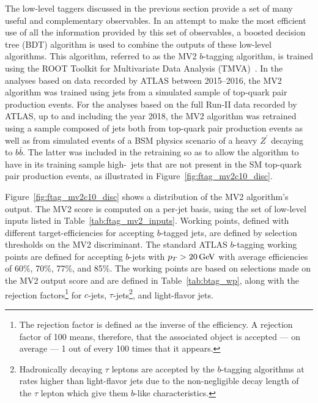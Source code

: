 The low-level taggers discussed in the previous section provide a set of many useful and complementary observables.
In an attempt to make the most efficient use of all the information provided by this set of observables,
a boosted decision tree (BDT) algorithm is used to combine the outputs of these low-level algorithms.
This algorithm, referred to as the MV2 $b$-tagging algorithm, is trained using the ROOT Toolkit for Multivariate
Data Analysis (TMVA)~\cite{TMVA}.
In the analyses based on data recorded by ATLAS between 2015--2016, the MV2 algorithm was trained using jets from
a simulated sample of top-quark pair production events.
For the analyses based on the full Run-II data recorded by ATLAS, up to and including the year 2018, the MV2
algorithm was retrained using a sample composed of jets both from top-quark
pair production events as well as from simulated events of a BSM physics scenario of a heavy $Z^{\prime}$ decaying to $b\bar{b}$.
The latter was included in the retraining so as to allow the algorithm to have in its training sample
high-\pT~jets that are not present in the SM top-quark pair production events, as illustrated in Figure~\ref{fig:ftag_mv2c10_disc}.

Figure~\ref{fig:ftag_mv2c10_disc} shows a distribution of the MV2 algorithm's output.
The MV2 score is computed on a per-jet basis, using the set of low-level inputs listed in Table~\ref{tab:ftag_mv2_inputs}.
Working points, defined with different target-efficiencies for accepting $b$-tagged jets, are defined
by selection thresholds on the MV2 discriminant.
The standard ATLAS $b$-tagging working points are defined for accepting $b$-jets with $p_{T}>20\,\text{Ge\kern -0.1em V}$ with
average efficiencies of 60\%, 70\%, 77\%, and 85\%. 
The working points are based on selections made on the MV2 output score and are defined in Table~\ref{tab:btag_wp}, along with the rejection factors\footnote{The rejection factor
is defined as the inverse of the efficiency. A rejection factor of 100 means, therefore, that the associated
object is accepted --- on average --- 1 out of every 100 times that it appears.}
for $c$-jets, $\tau$-jets\footnote{Hadronically decaying $\tau$ leptons are accepted by the $b$-tagging algorithms
at rates higher than light-flavor jets due to the non-negligible decay length of the $\tau$ lepton which give them $b$-like
characteristics.},
and light-flavor jets.



